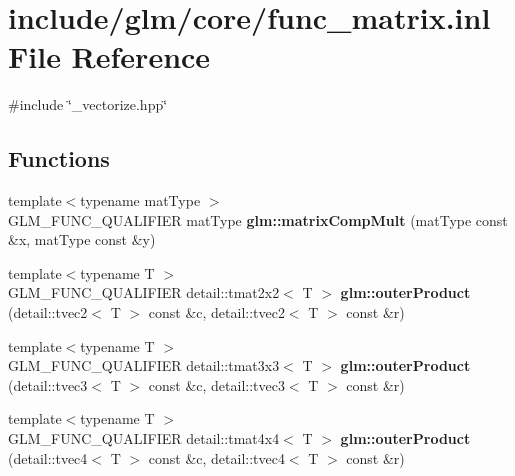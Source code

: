 \hypertarget{func__matrix_8inl}{\section{include/glm/core/func\-\_\-matrix.inl \-File \-Reference}
\label{func__matrix_8inl}
}
{\ttfamily \#include \char`\"{}\-\_\-vectorize.\-hpp\char`\"{}}\*
\subsection*{\-Functions}
\begin{DoxyCompactItemize}
\item 
\hypertarget{namespaceglm_ada2ed5581a39face12d6993bd00a4413}{{\footnotesize template$<$typename mat\-Type $>$ }\\\-G\-L\-M\-\_\-\-F\-U\-N\-C\-\_\-\-Q\-U\-A\-L\-I\-F\-I\-E\-R mat\-Type {\bfseries glm\-::matrix\-Comp\-Mult} (mat\-Type const \&x, mat\-Type const \&y)}\label{namespaceglm_ada2ed5581a39face12d6993bd00a4413}

\item 
\hypertarget{namespaceglm_a0cf59cce1b3f603f94cf33a61bceff19}{{\footnotesize template$<$typename T $>$ }\\\-G\-L\-M\-\_\-\-F\-U\-N\-C\-\_\-\-Q\-U\-A\-L\-I\-F\-I\-E\-R \*
detail\-::tmat2x2$<$ \-T $>$ {\bfseries glm\-::outer\-Product} (detail\-::tvec2$<$ \-T $>$ const \&c, detail\-::tvec2$<$ \-T $>$ const \&r)}\label{namespaceglm_a0cf59cce1b3f603f94cf33a61bceff19}

\item 
\hypertarget{namespaceglm_a0be7bdc804f3e5019ed50488ad96deed}{{\footnotesize template$<$typename T $>$ }\\\-G\-L\-M\-\_\-\-F\-U\-N\-C\-\_\-\-Q\-U\-A\-L\-I\-F\-I\-E\-R \*
detail\-::tmat3x3$<$ \-T $>$ {\bfseries glm\-::outer\-Product} (detail\-::tvec3$<$ \-T $>$ const \&c, detail\-::tvec3$<$ \-T $>$ const \&r)}\label{namespaceglm_a0be7bdc804f3e5019ed50488ad96deed}

\item 
\hypertarget{namespaceglm_a466c39ec56cd677039b0e768c2fbfbfe}{{\footnotesize template$<$typename T $>$ }\\\-G\-L\-M\-\_\-\-F\-U\-N\-C\-\_\-\-Q\-U\-A\-L\-I\-F\-I\-E\-R \*
detail\-::tmat4x4$<$ \-T $>$ {\bfseries glm\-::outer\-Product} (detail\-::tvec4$<$ \-T $>$ const \&c, detail\-::tvec4$<$ \-T $>$ const \&r)}\label{namespaceglm_a466c39ec56cd677039b0e768c2fbfbfe}


\end{DoxyCompactItemize}
